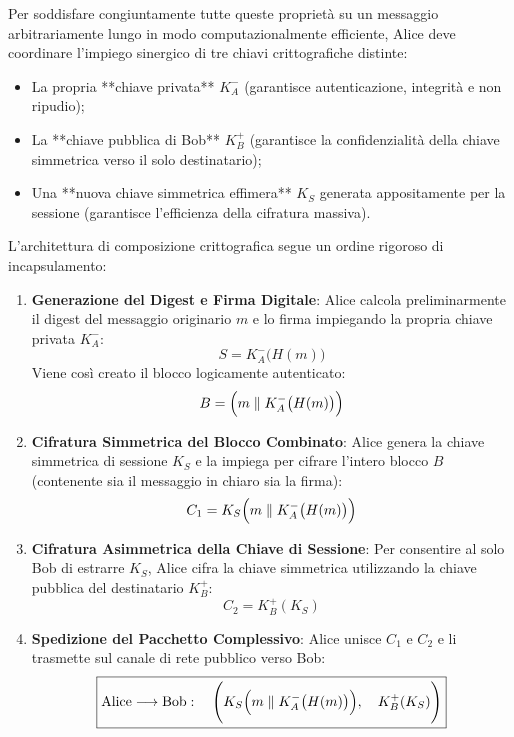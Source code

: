 \documentclass[11pt, a4paper]{article}
\begin{document}
Per soddisfare congiuntamente tutte queste proprietà su un messaggio arbitrariamente lungo in modo computazionalmente efficiente, Alice deve coordinare l'impiego sinergico di tre chiavi crittografiche distinte:
\begin{itemize}[noitemsep]
    \item La propria **chiave privata** $K_A^-$ (garantisce autenticazione, integrità e non ripudio);
    \item La **chiave pubblica di Bob** $K_B^+$ (garantisce la confidenzialità della chiave simmetrica verso il solo destinatario);
    \item Una **nuova chiave simmetrica effimera** $K_S$ generata appositamente per la sessione (garantisce l'efficienza della cifratura massiva).
\end{itemize}


L'architettura di composizione crittografica segue un ordine rigoroso di incapsulamento:
\begin{enumerate}[leftmargin=*]
    \item \textbf{Generazione del Digest e Firma Digitale}:
    Alice calcola preliminarmente il digest del messaggio originario $m$ e lo firma impiegando la propria chiave privata $K_A^-$:
    \[
    S = K_A^-\bigl(H(m)\bigr)
    \]
    Viene così creato il blocco logicamente autenticato:
    \[
    B = \Bigl(m \parallel K_A^-\bigl(H(m)\bigr)\Bigr)
    \]

    \item \textbf{Cifratura Simmetrica del Blocco Combinato}:
    Alice genera la chiave simmetrica di sessione $K_S$ e la impiega per cifrare l'intero blocco $B$ (contenente sia il messaggio in chiaro sia la firma):
    \[
    C_1 = K_S\Bigl(m \parallel K_A^-\bigl(H(m)\bigr)\Bigr)
    \]

    \item \textbf{Cifratura Asimmetrica della Chiave di Sessione}:
    Per consentire al solo Bob di estrarre $K_S$, Alice cifra la chiave simmetrica utilizzando la chiave pubblica del destinatario $K_B^+$:
    \[
    C_2 = K_B^+(K_S)
    \]

    \item \textbf{Spedizione del Pacchetto Complessivo}:
    Alice unisce $C_1$ e $C_2$ e li trasmette sul canale di rete pubblico verso Bob:
    \begin{equation}
    \boxed{\text{Alice} \longrightarrow \text{Bob}: \quad \Biggl(K_S\Bigl(m \parallel K_A^-\bigl(H(m)\bigr)\Bigr), \quad K_B^+(K_S)\Biggr)}
    \end{equation}
\end{enumerate}
\end{document}
